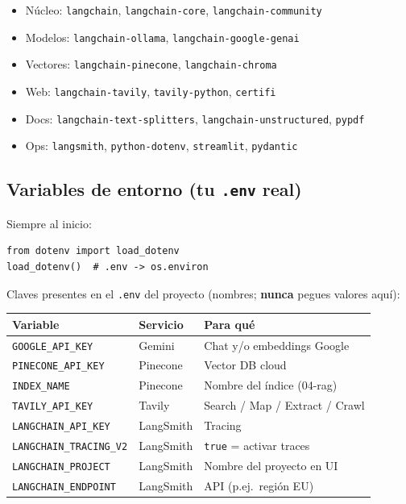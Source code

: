 \documentclass[11pt,a4paper]{article}
\begin{document}
\begin{itemize}[leftmargin=*,itemsep=1pt]
  \item Núcleo: \texttt{langchain}, \texttt{langchain-core}, \texttt{langchain-community}
  \item Modelos: \texttt{langchain-ollama}, \texttt{langchain-google-genai}
  \item Vectores: \texttt{langchain-pinecone}, \texttt{langchain-chroma}
  \item Web: \texttt{langchain-tavily}, \texttt{tavily-python}, \texttt{certifi}
  \item Docs: \texttt{langchain-text-splitters}, \texttt{langchain-unstructured}, \texttt{pypdf}
  \item Ops: \texttt{langsmith}, \texttt{python-dotenv}, \texttt{streamlit}, \texttt{pydantic}
\end{itemize}

\subsection{Variables de entorno (tu \texttt{.env} real)}
Siempre al inicio:

\begin{lstlisting}
from dotenv import load_dotenv
load_dotenv()  # .env -> os.environ
\end{lstlisting}

Claves presentes en el \texttt{.env} del proyecto (nombres; \textbf{nunca} pegues valores aquí):

\begin{center}
\begin{tabular}{@{}llp{6.2cm}@{}}
\toprule
\textbf{Variable} & \textbf{Servicio} & \textbf{Para qué} \\
\midrule
\texttt{GOOGLE\_API\_KEY} & Gemini & Chat y/o embeddings Google \\
\texttt{PINECONE\_API\_KEY} & Pinecone & Vector DB cloud \\
\texttt{INDEX\_NAME} & Pinecone & Nombre del índice (04-rag) \\
\texttt{TAVILY\_API\_KEY} & Tavily & Search / Map / Extract / Crawl \\
\texttt{LANGCHAIN\_API\_KEY} & LangSmith & Tracing \\
\texttt{LANGCHAIN\_TRACING\_V2} & LangSmith & \texttt{true} = activar traces \\
\texttt{LANGCHAIN\_PROJECT} & LangSmith & Nombre del proyecto en UI \\
\texttt{LANGCHAIN\_ENDPOINT} & LangSmith & API (p.ej.\ región EU) \\
\bottomrule
\end{tabular}
\end{center}
\end{document}
